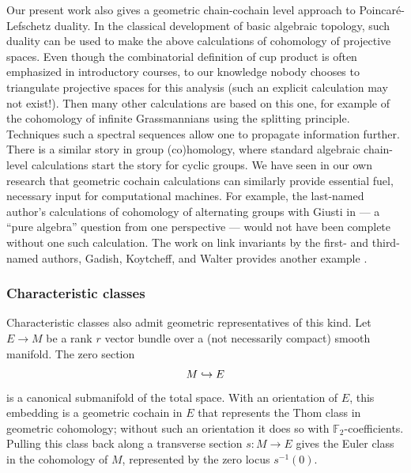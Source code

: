 Our present work also gives a geometric chain-cochain level approach to Poincar\'e-Lefschetz duality.
In the classical development of basic algebraic topology, such duality can be used to make the above calculations of cohomology of projective spaces.
Even though the combinatorial definition of cup product is often emphasized in introductory courses, to our knowledge nobody chooses to triangulate projective spaces for this analysis (such an explicit calculation may not exist!).
Then many other calculations are based on this one, for example of the cohomology of infinite Grassmannians using the splitting principle.
Techniques such a spectral sequences allow one to propagate information further.
There is a similar story in group (co)homology, where standard algebraic chain-level calculations start the story for cyclic groups.
We have seen in our own research that geometric cochain calculations can similarly provide essential fuel, necessary input for computational machines.
For example, the last-named author’s calculations of cohomology of alternating groups with Giusti in \cite{giusti2021alternating} --- a “pure algebra” question from one perspective --- would not have been complete without one such calculation.
The work on link invariants by the first- and third-named authors, Gadish, Koytcheff, and Walter provides another example \cite{FGKSW}.

\subsubsection{Characteristic classes}

Characteristic classes also admit geometric representatives of this kind.
Let $E \to M$ be a rank $r$ vector bundle over a (not necessarily compact) smooth manifold.
The zero section
\[
M \hookrightarrow E
\]
is a canonical submanifold of the total space.
With an orientation of $E$, this embedding is a geometric cochain in $E$ that represents the Thom class in geometric cohomology; without such an orientation it does so with $\mathbb{F}_2$-coefficients.
Pulling this class back along a transverse section $s \colon M \to E$ gives the Euler class in the cohomology of $M$, represented by the zero locus $s^{-1}(0)$.

